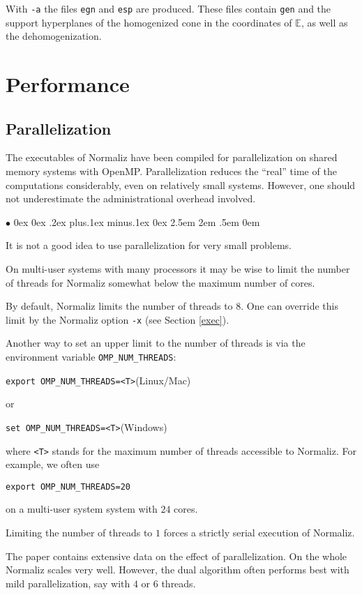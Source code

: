 \documentclass[12pt,a4paper]{scrartcl}
\newcommand{\stdli}{ \topsep0ex \partopsep0ex %
\parsep.2ex plus.1ex minus.1ex \itemsep0ex%
\leftmargin2.5em \labelwidth2em \labelsep.5em \rightmargin0em}%
\renewenvironment{itemize}{\begin{list}{{$\bullet$}}{\stdli}}{\end{list}}
\theoremstyle{definition}
\def\EE{{\mathbb E}}
\def\ttt{\texttt}
\begin{document}
With \verb|-a| the files \verb|egn| and \verb|esp| are produced. These files contain \verb|gen| and the support hyperplanes of the homogenized cone in the coordinates of $\EE$, as well as the dehomogenization.

\section{Performance}\label{Perf}

\subsection{Parallelization}\label{PerfPar}

The executables of Normaliz have been compiled for parallelization
on shared memory systems with OpenMP. Parallelization reduces the
``real'' time of the computations considerably, even on relatively
small systems. However, one should not underestimate the
administrational overhead involved.
\begin{itemize}
\item It is not a good idea to use parallelization for very small problems.
\item On multi-user systems with many processors it may be wise to limit
the number of threads for Normaliz somewhat below the maximum
number of cores.
\end{itemize}
By default, Normaliz limits the number of threads to 8. One can override this limit by the Normaliz
option \ttt{-x} (see Section \ref{exec}).

Another way to set an upper limit to the number of threads is via the environment variable \verb|OMP_NUM_THREADS|:
\begin{center}
	\verb+export OMP_NUM_THREADS=<T>+\qquad (Linux/Mac)
\end{center}
or
\begin{center}
	\verb+set OMP_NUM_THREADS=<T>+\qquad (Windows)
\end{center}
where \ttt{<T>} stands for the maximum number of threads
accessible to Normaliz. For example, we often use
\begin{center}
	\verb+export OMP_NUM_THREADS=20+
\end{center}
on a multi-user system system with $24$ cores.

Limiting the number of threads to $1$ forces a strictly serial
execution of Normaliz.

The paper \cite{BIS} contains extensive data on the effect of parallelization. On the whole Normaliz scales very well.
However, the dual algorithm often performs best with mild parallelization, say with $4$ or $6$ threads.
\end{document}
